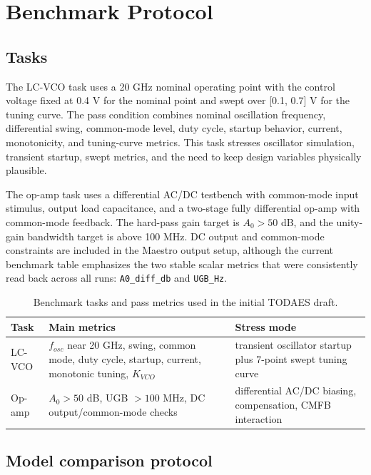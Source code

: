 \documentclass[acmsmall,review,anonymous]{acmart}
\newcommand{\metric}[1]{\texttt{#1}}
\begin{document}
\section{Benchmark Protocol}
\label{sec:protocol}

\subsection{Tasks}

The LC-VCO task uses a 20 GHz nominal operating point with the control voltage
fixed at 0.4 V for the nominal point and swept over [0.1, 0.7] V for the
tuning curve. The pass condition combines nominal oscillation frequency,
differential swing, common-mode level, duty cycle, startup behavior, current,
monotonicity, and tuning-curve metrics. This task stresses oscillator
simulation, transient startup, swept metrics, and the need to keep design
variables physically plausible.

The op-amp task uses a differential AC/DC testbench with common-mode input
stimulus, output load capacitance, and a two-stage fully differential op-amp
with common-mode feedback. The hard-pass gain target is
$A_0 > 50$ dB, and the unity-gain bandwidth target is above 100 MHz. DC output
and common-mode constraints are included in the Maestro output setup, although
the current benchmark table emphasizes the two stable scalar metrics that were
consistently read back across all runs: \metric{A0\_diff\_db} and
\metric{UGB\_Hz}.

\begin{table}[t]
  \centering
  \caption{Benchmark tasks and pass metrics used in the initial TODAES draft.}
  \label{tab:tasks}
  \begin{tabularx}{\linewidth}{l X X}
    \toprule
    Task & Main metrics & Stress mode \\
    \midrule
    LC-VCO & $f_{osc}$ near 20 GHz, swing, common mode, duty cycle,
    startup, current, monotonic tuning, $K_{VCO}$ & transient oscillator
    startup plus 7-point swept tuning curve \\
    Op-amp & $A_0>50$ dB, UGB $>100$ MHz, DC output/common-mode checks &
    differential AC/DC biasing, compensation, CMFB interaction \\
    \bottomrule
  \end{tabularx}
\end{table}

\subsection{Model comparison protocol}
\end{document}

